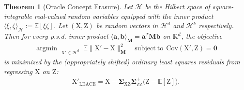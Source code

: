 \documentclass{article}
\theoremstyle{plain}
\newtheorem{theorem}{Theorem}[section]
\theoremstyle{remark}
\newcommand{\sxz}{\mathbf \Sigma_{\rv X \rv Z}}
\newcommand{\szz}{\mathbf \Sigma_{\rv Z \rv Z}}
\newcommand{\E}{\mathbb E}
\newcommand{\R}{\mathbb{R}}
\theoremstyle{plain}
\theoremstyle{TheoremNum}
\newcommand{\rv}[1]{{\mathrm{#1}}}
\renewcommand{\R}{{\color{black} \mathbb{R}}}
\begin{document}
\begin{theorem}[Oracle Concept Erasure]\label{thm:oleace}
    Let $\mathcal H$ be the Hilbert space of square-integrable real-valued random variables equipped with the inner product $\langle \xi, \zeta \rangle_{\mathcal H} := \E[\xi \zeta]$. Let $(\rv X, \rv Z)$ be random vectors in $\mathcal H^d$ and $\mathcal H^k$ respectively. Then for every p.s.d. inner product $\langle \mathbf a, \mathbf b \rangle_{\mathbf M} = \mathbf a^T \mathbf M \mathbf b$ on $\R^d$, the objective
    \begin{align*}
        \mathop{\mathrm{argmin\:}}_{\substack{\rv X' \in \mathcal H^d}} \E \big\| \rv X' - \rv X \big\|^2_{\mathbf M} \quad \mathrm{subject\:to}\:\: \mathrm{Cov}(\rv X', \rv Z) = \mathbf{0}
    \end{align*}
    is minimized by the (appropriately shifted) ordinary least squares residuals from regressing $\rv X$ on $\rv Z$:
    \begin{align*}
        \rv X'_{\mathrm{LEACE}} = \rv X - \sxz \szz^+ \big( \rv Z - \E[\rv Z] \big).
    \end{align*}
\end{theorem}
\end{document}
